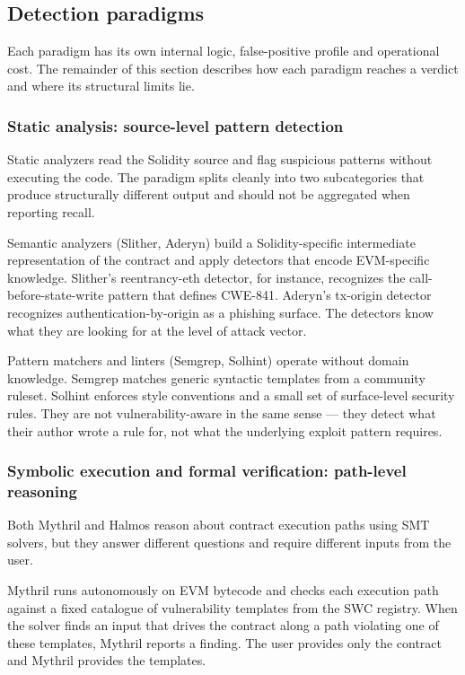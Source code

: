 \subsection{Detection paradigms}

Each paradigm has its own internal logic, false-positive profile and operational cost. The remainder of this section describes how each paradigm reaches a verdict and where its structural limits lie.

\subsubsection{Static analysis: source-level pattern detection}

Static analyzers read the Solidity source and flag suspicious patterns without executing the code. The paradigm splits cleanly into two subcategories that produce structurally different output and should not be aggregated when reporting recall.

Semantic analyzers (Slither, Aderyn) build a Solidity-specific intermediate representation of the contract and apply detectors that encode EVM-specific knowledge. Slither's reentrancy-eth detector, for instance, recognizes the call-before-state-write pattern that defines CWE-841. Aderyn's tx-origin detector recognizes authentication-by-origin as a phishing surface. The detectors know what they are looking for at the level of attack vector.

Pattern matchers and linters (Semgrep, Solhint) operate without domain knowledge. Semgrep matches generic syntactic templates from a community ruleset. Solhint enforces style conventions and a small set of surface-level security rules. They are not vulnerability-aware in the same sense — they detect what their author wrote a rule for, not what the underlying exploit pattern requires.

\subsubsection{Symbolic execution and formal verification: path-level reasoning}

Both Mythril and Halmos reason about contract execution paths using SMT solvers, but they answer different questions and require different inputs from the user.

Mythril runs autonomously on EVM bytecode and checks each execution path against a fixed catalogue of vulnerability templates from the SWC registry. When the solver finds an input that drives the contract along a path violating one of these templates, Mythril reports a finding. The user provides only the contract and Mythril provides the templates.

